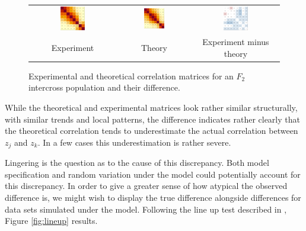 \documentclass{article}
\begin{document}
\begin{figure}[htp]
  \begin{center}
    \begin{tabular}{ccc}
      \includegraphics[width = 0.300\textwidth]{./img/chevCorr.png} &
      \includegraphics[width = 0.300\textwidth]{./img/chevCorrTheory.png} &
      \includegraphics[width = 0.300\textwidth]{./img/chevCorrDiff.png} \\
      {\footnotesize Experiment} &
      {\footnotesize Theory} &
      {\footnotesize Experiment minus theory} \\
    \end{tabular}
  \end{center}
  \caption{Experimental and theoretical correlation matrices for an $F_2$ intercross population and their difference.}
  \label{fig:corr2real}
\end{figure}

While the theoretical and experimental matrices look rather similar structurally, with similar trends and local patterns, the difference indicates rather clearly that the theoretical correlation tends to underestimate the actual correlation between $z_j$ and $z_k$. In a few cases this underestimation is rather severe.

Lingering is the question as to the cause of this discrepancy. Both model specification and random variation under the model could potentially account for this discrepancy. In order to give a greater sense of how atypical the observed difference is, we might wish to display the true difference alongside differences for data sets simulated under the model. Following the line up test described in \cite{bujaetal2009}, Figure \ref{fig:lineup} results.
\end{document}
